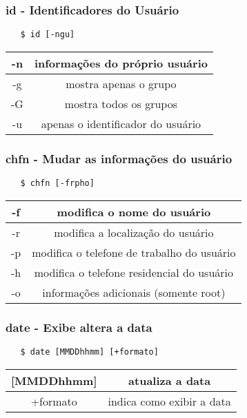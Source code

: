 \documentclass{beamer}
\begin{document}
\begin{frame}[fragile]
   \frametitle{id - Identificadores do Usuário}
   \begin{verbatim}
   $ id [-ngu]
   \end{verbatim}
   \begin{table}
      \begin{tabular}{ c | c }
         -n & informações do próprio usuário \\
         \hline 
         -g & mostra apenas o grupo \\ 
         \hline
	 -G & mostra todos os grupos \\ 
         \hline
	 -u & apenas o identificador do usuário \\ 
      \end{tabular}
   \end{table}
\end{frame}

\begin{frame}[fragile]
   \frametitle{chfn - Mudar as informações do usuário}
   \begin{verbatim}
   $ chfn [-frpho]
   \end{verbatim}
   \begin{table}
      \begin{tabular}{ c | c }
         -f & modifica o nome do usuário \\
         \hline 
         -r & modifica a localização do usuário \\ 
         \hline
	 -p & modifica o telefone de trabalho do usuário \\
         \hline
	 -h & modifica o telefone residencial do usuário \\ 
         \hline
         -o & informações adicionais (somente root) \\ 
      \end{tabular}
   \end{table}
\end{frame}

\begin{frame}[fragile]
   \frametitle{date - Exibe altera a data}
   \begin{verbatim}
   $ date [MMDDhhmm] [+formato]
   \end{verbatim}
   \begin{table}
      \begin{tabular}{ c | c }
         [MMDDhhmm] & atualiza a data \\
         \hline 
         +formato & indica como exibir a data \\ 
      \end{tabular}
   \end{table}
\end{frame}
\end{document}
